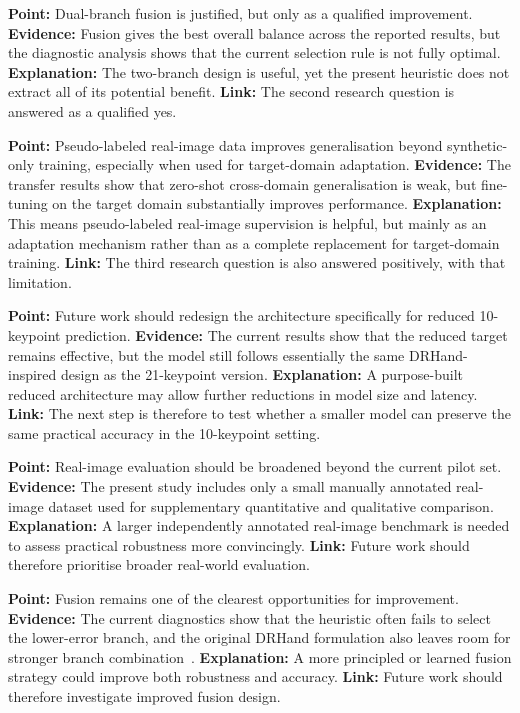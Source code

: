 \documentclass[10pt,letterpaper]{article}
\begin{document}
\medskip
\noindent\textbf{Point:} Dual-branch fusion is justified, but only as a qualified improvement.
\textbf{Evidence:} Fusion gives the best overall balance across the reported results, but the diagnostic analysis shows that the current selection rule is not fully optimal.
\textbf{Explanation:} The two-branch design is useful, yet the present heuristic does not extract all of its potential benefit.
\textbf{Link:} The second research question is answered as a qualified yes.

\medskip
\noindent\textbf{Point:} Pseudo-labeled real-image data improves generalisation beyond synthetic-only training, especially when used for target-domain adaptation.
\textbf{Evidence:} The transfer results show that zero-shot cross-domain generalisation is weak, but fine-tuning on the target domain substantially improves performance.
\textbf{Explanation:} This means pseudo-labeled real-image supervision is helpful, but mainly as an adaptation mechanism rather than as a complete replacement for target-domain training.
\textbf{Link:} The third research question is also answered positively, with that limitation.

\medskip
\noindent\textbf{Point:} Future work should redesign the architecture specifically for reduced 10-keypoint prediction.
\textbf{Evidence:} The current results show that the reduced target remains effective, but the model still follows essentially the same DRHand-inspired design as the 21-keypoint version.
\textbf{Explanation:} A purpose-built reduced architecture may allow further reductions in model size and latency.
\textbf{Link:} The next step is therefore to test whether a smaller model can preserve the same practical accuracy in the 10-keypoint setting.

\medskip
\noindent\textbf{Point:} Real-image evaluation should be broadened beyond the current pilot set.
\textbf{Evidence:} The present study includes only a small manually annotated real-image dataset used for supplementary quantitative and qualitative comparison.
\textbf{Explanation:} A larger independently annotated real-image benchmark is needed to assess practical robustness more convincingly.
\textbf{Link:} Future work should therefore prioritise broader real-world evaluation.

\medskip
\noindent\textbf{Point:} Fusion remains one of the clearest opportunities for improvement.
\textbf{Evidence:} The current diagnostics show that the heuristic often fails to select the lower-error branch, and the original DRHand formulation also leaves room for stronger branch combination~\cite{dualreg}.
\textbf{Explanation:} A more principled or learned fusion strategy could improve both robustness and accuracy.
\textbf{Link:} Future work should therefore investigate improved fusion design.
\end{document}
